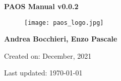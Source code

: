 

\begin{titlepage}

    \centering

    \vspace*{30mm} %
    \textbf{\Huge {PAOS Manual v0.0.2}}

    \vspace{20mm}
    \begin{figure}[!h]
        \centering
        \texttt{[image: paos\_logo.jpg]}
        \label{fig:paos_logo}
    \end{figure}

    \vspace{25mm}
    \Large \textbf{{Andrea Bocchieri, Enzo Pascale}}

    \vspace*{8mm}
    \small Created on: December, 2021

    \vspace{2mm}
    \small Last updated: \MonthYearFormat\today


\end{titlepage}

\clearpage
{}
\tableofcontents
\listoffigures
\listoftables
\clearpage
{}